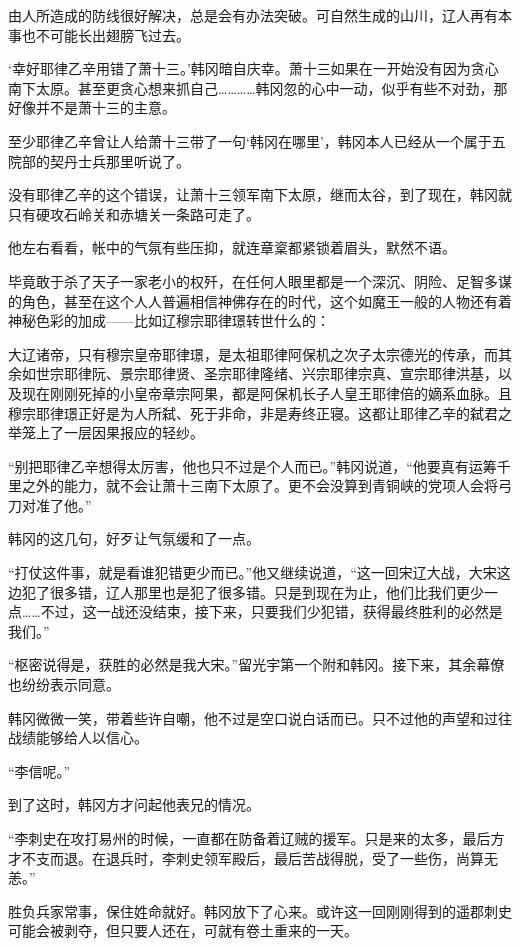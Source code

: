 由人所造成的防线很好解决，总是会有办法突破。可自然生成的山川，辽人再有本事也不可能长出翅膀飞过去。

‘幸好耶律乙辛用错了萧十三。’韩冈暗自庆幸。萧十三如果在一开始没有因为贪心南下太原。甚至更贪心想来抓自己…………韩冈忽的心中一动，似乎有些不对劲，那好像并不是萧十三的主意。

至少耶律乙辛曾让人给萧十三带了一句‘韩冈在哪里’，韩冈本人已经从一个属于五院部的契丹士兵那里听说了。

没有耶律乙辛的这个错误，让萧十三领军南下太原，继而太谷，到了现在，韩冈就只有硬攻石岭关和赤塘关一条路可走了。

他左右看看，帐中的气氛有些压抑，就连章楶都紧锁着眉头，默然不语。

毕竟敢于杀了天子一家老小的权歼，在任何人眼里都是一个深沉、阴险、足智多谋的角色，甚至在这个人人普遍相信神佛存在的时代，这个如魔王一般的人物还有着神秘色彩的加成——比如辽穆宗耶律璟转世什么的：

大辽诸帝，只有穆宗皇帝耶律璟，是太祖耶律阿保机之次子太宗德光的传承，而其余如世宗耶律阮、景宗耶律贤、圣宗耶律隆绪、兴宗耶律宗真、宣宗耶律洪基，以及现在刚刚死掉的小皇帝章宗阿果，都是阿保机长子人皇王耶律倍的嫡系血脉。且穆宗耶律璟正好是为人所弑、死于非命，非是寿终正寝。这都让耶律乙辛的弑君之举笼上了一层因果报应的轻纱。

“别把耶律乙辛想得太厉害，他也只不过是个人而已。”韩冈说道，“他要真有运筹千里之外的能力，就不会让萧十三南下太原了。更不会没算到青铜峡的党项人会将弓刀对准了他。”

韩冈的这几句，好歹让气氛缓和了一点。

“打仗这件事，就是看谁犯错更少而已。”他又继续说道，“这一回宋辽大战，大宋这边犯了很多错，辽人那里也是犯了很多错。只是到现在为止，他们比我们更少一点……不过，这一战还没结束，接下来，只要我们少犯错，获得最终胜利的必然是我们。”

“枢密说得是，获胜的必然是我大宋。”留光宇第一个附和韩冈。接下来，其余幕僚也纷纷表示同意。

韩冈微微一笑，带着些许自嘲，他不过是空口说白话而已。只不过他的声望和过往战绩能够给人以信心。

“李信呢。”

到了这时，韩冈方才问起他表兄的情况。

“李刺史在攻打易州的时候，一直都在防备着辽贼的援军。只是来的太多，最后方才不支而退。在退兵时，李刺史领军殿后，最后苦战得脱，受了一些伤，尚算无恙。”

胜负兵家常事，保住姓命就好。韩冈放下了心来。或许这一回刚刚得到的遥郡刺史可能会被剥夺，但只要人还在，可就有卷土重来的一天。

